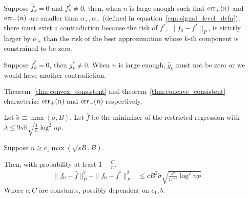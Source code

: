 Suppose $\hat{f}_k = 0$ and $f^*_k \neq 0$, then, when $n$ is large enough such that $\textrm{err}_+(n)$ and $\textrm{err}_-(n)$ are smaller than $\alpha_+, \alpha_-$ (defined in equation~\ref{eqn:signal_level_defn}), there must exist a contradiction because the risk of $f^*$, $\| f_0 - f^* \|_P$, is strictly larger by $\alpha_+$ than the risk of the best approximation whose $k$-th component is constrained to be zero. 

Suppose $f^*_k = 0$, then $g^*_k \neq 0$. When $n$ is large enough, $\hat{g}_k$ must not be zero or we would have another contradiction. 

Theorem~\ref{thm:convex_consistent} and theorem~\ref{thm:concave_consistent} characterize $\textrm{err}_+(n)$ and $\textrm{err}_-(n)$ respectively.

\begin{theorem}
\label{thm:convex_consistent}
Let $\tilde{\sigma} \equiv \max(\sigma, B)$. Let $\hat{f}$ be the minimizer of the restricted regression with $\lambda \leq 9 s \tilde{\sigma} \sqrt{ \frac{1}{n} \log^2 np}$.

Suppose $n \geq c_1 \max(\sqrt{sB}, B)$.

Then, with probability at least $1-\frac{C}{n}$,
\begin{align}
\|f_0 - \hat{f} \|_P^2 - \| f_0 - f^* \|_P^2 
&\leq c B^2 \tilde{\sigma} \sqrt{ \frac{s^5}{n^{4/5}} \log^2 np}
\end{align}
Where $c, C$ are constants, possibly dependent on $c_1, b$.

\end{theorem}


